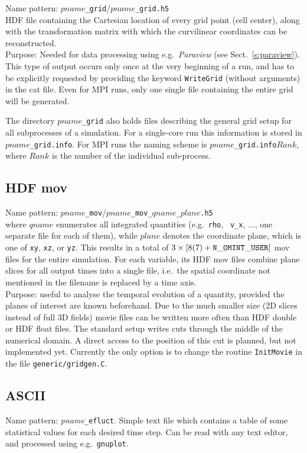 Name pattern:
$pname${\tt\_grid}/$pname${\tt\_grid.h5} \\
HDF file containing the Cartesian location of every grid point (cell center),
along with the transformation matrix with which the curvilinear coordinates
can be reconstructed.\\
Purpose: Needed for data processing using e.g.\ {\em Paraview} (see
Sect.~\ref{s:paraview}).
This type of output occurs only once at the very beginning of a run, and has
to be explicitly requested by providing the keyword {\tt WriteGrid}
(without arguments) in the cat file. Even for MPI runs, only one single file
containing the entire grid will be generated.

The directory $pname${\tt\_grid} also holds files describing the
general grid setup for all subprocesses of a simulation. For a
single-core run this information is stored in
$pname${\tt\_grid.info}. For MPI runs the naming scheme is
$pname${\tt\_grid.info}$Rank$, where $Rank$ is the number of the
individual sub-process.

\subsection{HDF mov}
Name pattern:
$pname${\tt\_mov}/$pname${\tt\_mov\_$qname$\_$plane$.h5}\\ where
$qname$ enumerates all integrated quantities (e.g.\ {\tt rho}, {\tt
  v\_x}, $\ldots$, one separate file for each of them), while $plane$
denotes the coordinate plane, which is one of {\tt xy}, {\tt xz}, or
{\tt yz}. This results in a total of \mbox{$3 \times [8(7)+{\tt
      N\_OMINT\_USER}]$} mov files for the entire simulation. For each
variable, its HDF mov files combine plane slices for all output times
into a single file, i.e.\ the spatial coordinate not mentioned in the
filename is replaced by a time axis.\\ Purpose: useful to analyse the
temporal evolution of a quantity, provided the planes of interest are
known beforehand. Due to the much smaller size (2D slices instead of
full 3D fields) movie files can be written more often than HDF double
or HDF float files. The standard setup writes cuts through the middle
of the numerical domain. A direct access to the position of this cut
is planned, but not implemented yet. Currently the only option is to
change the routine \verb+InitMovie+ in the file
\verb+generic/gridgen.C+.

\subsection{ASCII}
Name pattern: {\it pname}{\tt\_efluct}. Simple text file which
contains a table of some statistical values for each desired time
step. Can be read with any text editor, and processed using e.g.\
{\tt gnuplot}.
